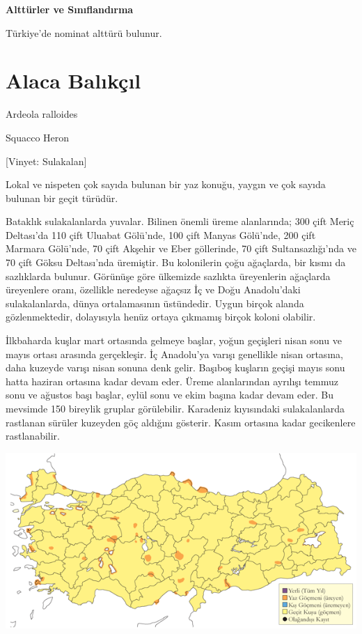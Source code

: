 \documentclass[
  letterpaper,
  DIV=11,
  numbers=noendperiod]{scrreprt}
\begin{document}
\textbf{Alttürler ve Sınıflandırma}

Türkiye'de nominat alttürü bulunur.

\section{Alaca Balıkçıl}\label{alaca-balux131kuxe7ux131l}

Ardeola ralloides

Squacco Heron

{[}Vinyet: Sulakalan{]}

Lokal ve nispeten çok sayıda bulunan bir yaz konuğu, yaygın ve çok
sayıda bulunan bir geçit türüdür.

Bataklık sulakalanlarda yuvalar. Bilinen önemli üreme alanlarında; 300
çift Meriç Deltası'da 110 çift Uluabat Gölü'nde, 100 çift Manyas
Gölü'nde, 200 çift Marmara Gölü'nde, 70 çift Akşehir ve Eber göllerinde,
70 çift Sultansazlığı'nda ve 70 çift Göksu Deltası'nda üremiştir. Bu
kolonilerin çoğu ağaçlarda, bir kısmı da sazlıklarda bulunur. Görünüşe
göre ülkemizde sazlıkta üreyenlerin ağaçlarda üreyenlere oranı,
özellikle neredeyse ağaçsız İç ve Doğu Anadolu'daki sulakalanlarda,
dünya ortalamasının üstündedir. Uygun birçok alanda gözlenmektedir,
dolayısıyla henüz ortaya çıkmamış birçok koloni olabilir.

İlkbaharda kuşlar mart ortasında gelmeye başlar, yoğun geçişleri nisan
sonu ve mayıs ortası arasında gerçekleşir. İç Anadolu'ya varışı
genellikle nisan ortasına, daha kuzeyde varışı nisan sonuna denk gelir.
Başıboş kuşların geçişi mayıs sonu hatta haziran ortasına kadar devam
eder. Üreme alanlarından ayrılışı temmuz sonu ve ağustos başı başlar,
eylül sonu ve ekim başına kadar devam eder. Bu mevsimde 150 bireylik
gruplar görülebilir. Karadeniz kıyısındaki sulakalanlarda rastlanan
sürüler kuzeyden göç aldığını gösterir. Kasım ortasına kadar gecikenlere
rastlanabilir.

\includegraphics{images/harita_Page_067.png}
\end{document}

